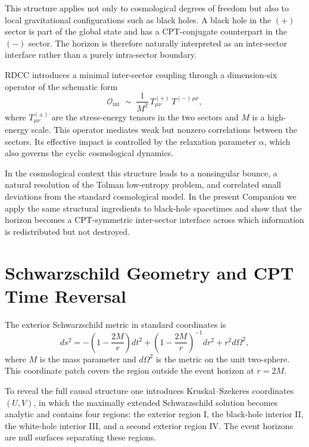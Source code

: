 \documentclass[11pt,a4paper]{article}
\begin{document}
This structure applies not only to cosmological degrees of freedom but also to local
gravitational configurations such as black holes. A black hole in the $(+)$ sector is part of
the global state and has a CPT-conjugate counterpart in the $(-)$ sector. The horizon is
therefore naturally interpreted as an inter-sector interface rather than a purely intra-sector
boundary.

RDCC introduces a minimal inter-sector coupling through a dimension-six operator of the
schematic form
\begin{equation}
\mathcal{O}_{\mathrm{int}}
\;\sim\;
\frac{1}{M^{2}}
\,T^{(+)}_{\mu\nu}\,T^{(-)\,\mu\nu},
\end{equation}
where $T^{(\pm)}_{\mu\nu}$ are the stress-energy tensors in the two sectors and $M$ is a
high-energy scale. This operator mediates weak but nonzero correlations between the
sectors. Its effective impact is controlled by the relaxation parameter $\alpha$, which also
governs the cyclic cosmological dynamics.

In the cosmological context this structure leads to a nonsingular bounce, a natural
resolution of the Tolman low-entropy problem, and correlated small deviations from the
standard cosmological model. In the present Companion we apply the same structural
ingredients to black-hole spacetimes and show that the horizon becomes a CPT-symmetric
inter-sector interface across which information is redistributed but not destroyed.


\section{Schwarzschild Geometry and CPT Time Reversal}

The exterior Schwarzschild metric in standard coordinates is
\begin{equation}
ds^{2}
=
-\left(1-\frac{2M}{r}\right) dt^{2}
+
\left(1-\frac{2M}{r}\right)^{-1} dr^{2}
+
r^{2} d\Omega^{2},
\end{equation}
where $M$ is the mass parameter and $d\Omega^{2}$ is the metric on the unit two-sphere.
This coordinate patch covers the region outside the event horizon at $r = 2M$.

To reveal the full causal structure one introduces Kruskal–Szekeres coordinates $(U,V)$,
in which the maximally extended Schwarzschild solution becomes analytic and contains
four regions: the exterior region I, the black-hole interior II, the white-hole interior III,
and a second exterior region IV. The event horizons are null surfaces separating these
regions.
\end{document}
